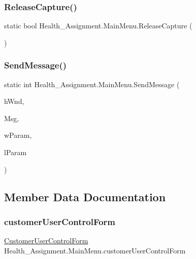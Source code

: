 \subsubsection{\texorpdfstring{Release\+Capture()}{ReleaseCapture()}}
{\footnotesize\ttfamily static bool Health\+\_\+\+Assignment.\+Main\+Menu.\+Release\+Capture (\begin{DoxyParamCaption}{ }\end{DoxyParamCaption})}

\mbox{\label{class_health___assignment_1_1_main_menu_a44c86004f90d336070e9b3ce44b5c0c3}} 
\subsubsection{\texorpdfstring{Send\+Message()}{SendMessage()}}
{\footnotesize\ttfamily static int Health\+\_\+\+Assignment.\+Main\+Menu.\+Send\+Message (\begin{DoxyParamCaption}\item[{Int\+Ptr}]{h\+Wnd,  }\item[{int}]{Msg,  }\item[{int}]{w\+Param,  }\item[{int}]{l\+Param }\end{DoxyParamCaption})}



\subsection{Member Data Documentation}
\mbox{\label{class_health___assignment_1_1_main_menu_a3a330cc89d5299efda46613fe1f2b5a2}} 
\subsubsection{\texorpdfstring{customer\+User\+Control\+Form}{customerUserControlForm}}
{\footnotesize\ttfamily \hyperlink{class_health___assignment_1_1_customer_user_control_form}{Customer\+User\+Control\+Form} Health\+\_\+\+Assignment.\+Main\+Menu.\+customer\+User\+Control\+Form}


